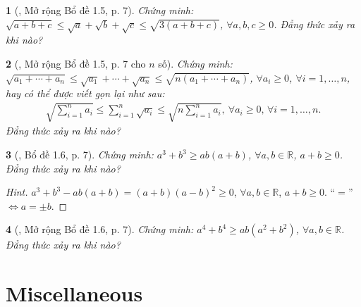 \documentclass{article}
\newtheorem{baitoan}{}
\begin{document}
\begin{baitoan}[\cite{Son_Nghiep_Trung_Can2021}, Mở rộng Bổ đề 1.5, p. 7]
	Chứng minh: $\sqrt{a + b + c}\le\sqrt{a} + \sqrt{b} + \sqrt{c}\le\sqrt{3(a + b + c)}$, $\forall a,b,c\ge 0$. Đẳng thức xảy ra khi nào?
\end{baitoan}

\begin{baitoan}[\cite{Son_Nghiep_Trung_Can2021}, Mở rộng Bổ đề 1.5, p. 7 cho $n$ số]
	Chứng minh: $\sqrt{a_1 + \cdots + a_n}\le\sqrt{a_1} + \cdots + \sqrt{a_n}\le\sqrt{n(a_1 + \cdots + a_n)}$, $\forall a_i\ge 0$, $\forall i = 1,\ldots,n$, hay có thể được viết gọn lại như sau:
	\begin{align*}
		\sqrt{\sum_{i=1}^n a_i}\le\sum_{i=1}^n \sqrt{a_i}\le\sqrt{n\sum_{i=1}^n a_i},\ \forall a_i\ge 0,\,\forall i = 1,\ldots,n.
	\end{align*}
	Đẳng thức xảy ra khi nào?
\end{baitoan}

\begin{baitoan}[\cite{Son_Nghiep_Trung_Can2021}, Bổ đề 1.6, p. 7]
	Chứng minh: $a^3 + b^3\ge ab(a + b)$, $\forall a,b\in\mathbb{R}$, $a + b\ge 0$. Đẳng thức xảy ra khi nào?
\end{baitoan}

\begin{proof}[Hint]
	$a^3 + b^3 - ab(a + b) = (a + b)(a - b)^2\ge 0$, $\forall a,b\in\mathbb{R}$, $a + b\ge 0$. ``$=$'' $\Leftrightarrow a = \pm b$.
\end{proof}

\begin{baitoan}[\cite{Son_Nghiep_Trung_Can2021}, Mở rộng Bổ đề 1.6, p. 7]
	Chứng minh: $a^4 + b^4\ge ab(a^2 + b^2)$, $\forall a,b\in\mathbb{R}$. Đẳng thức xảy ra khi nào?
\end{baitoan}


\section{Miscellaneous}


\printbibliography[heading=bibintoc]
\end{document}
